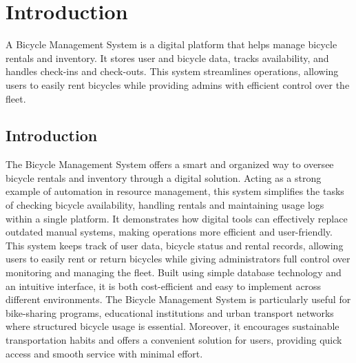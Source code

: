 \chapter{Introduction}
A Bicycle Management System is a digital platform that helps manage bicycle rentals and inventory. It stores user and bicycle data, tracks availability, and handles check-ins and check-outs. This system streamlines operations, allowing users to easily rent bicycles while providing admins with efficient control over the fleet.
\justifying
\section{Introduction}
The Bicycle Management System offers a smart and organized way to oversee bicycle rentals and inventory through a digital solution. Acting as a strong example of automation in resource management, this system simplifies the tasks of checking bicycle availability, handling rentals and maintaining usage logs within a single platform. It demonstrates how digital tools can effectively replace outdated manual systems, making operations more efficient and user-friendly.
This system keeps track of user data, bicycle status and rental records, allowing users to easily rent or return bicycles while giving administrators full control over monitoring and managing the fleet. Built using simple database technology and an intuitive interface, it is both cost-efficient and easy to implement across different environments.
The Bicycle Management System is particularly useful for bike-sharing programs, educational institutions and urban transport networks where structured bicycle usage is essential. Moreover, it encourages sustainable transportation habits and offers a convenient solution for users, providing quick access and smooth service with minimal effort.\cite{1.1}

